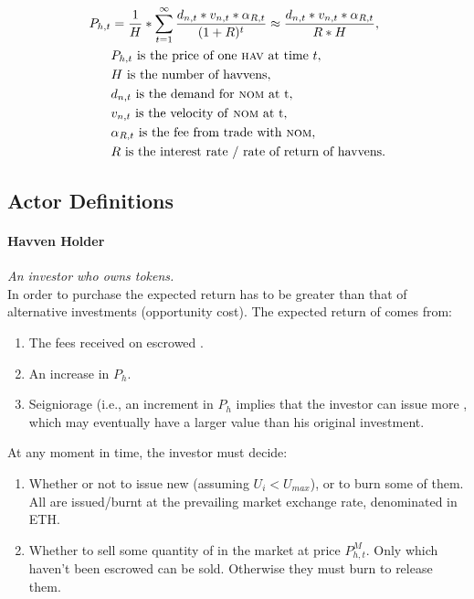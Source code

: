 \begin{align*} 
P_{h,t} &= \frac{1}{H}* \sum\limits_{t=1}^\infty \frac{d_{n,t} *v_{n,t} * \alpha_{R,t}}{(1+R)^t} \approx \frac{d_{n,t} *v_{n,t} * \alpha_{R,t}}{R * H}, \\
& P_{h,t} \text{ is the price of one \textsc{hav}{} at time } t, \\
& H \text{ is the number of havvens}, \\
& d_{n,t} \text{ is the demand for \textsc{nom}{} at t}, \\
& v_{n,t} \text{ is the velocity of \textsc{nom}{} at t}, \\
& \alpha_{R,t} \text{ is the fee from trade with \textsc{nom}{}}, \\
& R \text{ is the interest rate / rate of return of havvens}. \\
\end{align*}

\newpage

\subsection{Actor Definitions}
\paragraph{Havven Holder}
\emph{An investor who owns \HAV{} tokens.} \\

\noindent In order to purchase \HAV{} the expected return has to be greater than that of alternative investments (opportunity cost). The expected return of \HAV{} comes from:
\begin{enumerate}
\item{The fees received on escrowed \HAV{}.}
\item{An increase in $P_h$.}
\item{Seigniorage (i.e., an increment in $P_h$ implies that the investor can issue more \NOM{}, which may eventually have a larger value than his original investment.}
\end{enumerate}

\noindent At any moment in time, the investor must decide:
\begin{enumerate}
\item{Whether or not to issue new \NOM{} (assuming $U_i < U_{max}$), or to burn some of them. All \NOM{} are issued/burnt at the prevailing market exchange rate, denominated in ETH.}
\item{Whether to sell some quantity of \HAV{} in the market at price $P^M_{h,t}$. Only \HAV{} which haven't been escrowed can be sold. Otherwise they must burn \NOM{} to release them. }
\end{enumerate}

